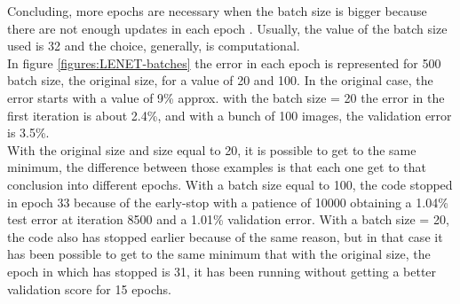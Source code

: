 Concluding, more epochs are necessary when the batch size is bigger because there are not enough updates in each epoch \cite{Yoshua}. Usually, the value of the batch size used is 32 \cite{Yoshua} and the choice, generally, is computational.\\

In figure \ref{figures:LENET-batches} the error in each epoch is represented  for 500 batch size, the original size, for a value of 20 and 100. In the original case, the error starts with a value of 9\% approx. with the batch size = 20 the error in the first iteration is about 2.4\%, and with a bunch of 100 images, the validation error is 3.5\%.\\

With the original size and size equal to 20, it is possible to get to the same minimum, the difference between those examples is that each one get to that conclusion into different epochs. With a batch size equal to 100, the code stopped in epoch 33 because of the early-stop with a patience of 10000 obtaining a 1.04\% test error at iteration 8500 and a 1.01\% validation error. With a batch size = 20, the code also has stopped earlier because of the same reason, but in that case it has been possible to get to the same minimum that with the original size, the epoch in which has stopped is 31, it has been running without getting a better validation score for 15 epochs.


